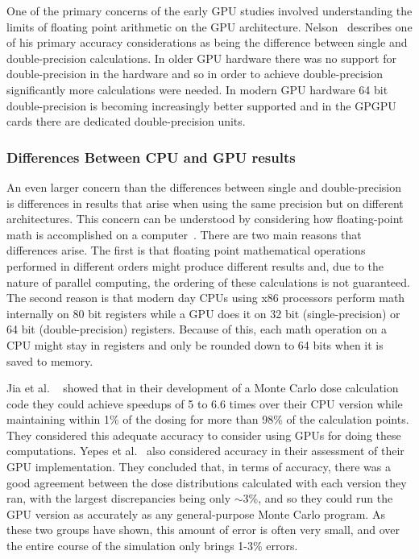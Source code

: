 One of the primary concerns of the early GPU studies involved understanding the limits of floating point arithmetic on the GPU architecture.
%
Nelson~\cite{nelson2009monte} describes one of his primary accuracy considerations as being the difference between single and double-precision calculations.
%
In older GPU hardware there was no support for double-precision in the hardware and so in order to achieve double-precision significantly more calculations were needed.
%
In modern GPU hardware 64 bit double-precision is becoming increasingly better supported and in the GPGPU cards there are dedicated double-precision units.
%

\subsubsection*{\textbf{Differences Between CPU and GPU results}}

An even larger concern than the differences between single and double-precision is differences in results that arise when using the same precision but on different architectures.
%
This concern can be understood by considering how floating-point math is accomplished on a computer~\cite{goldberg1991every}.
%
There are two main reasons that differences arise.
%
The first is that floating point mathematical operations performed in different orders might produce different results and, due to the nature of parallel computing, the ordering of these calculations is not guaranteed.
%
The second reason is that modern day CPUs using x86 processors perform math internally on 80 bit registers while a GPU does it on 32 bit (single-precision) or 64 bit (double-precision) registers.
%
Because of this, each math operation on a CPU might stay in registers and only be rounded down to 64 bits when it is saved to memory.
%

%
Jia et al. ~\cite{jia2010development} showed that in their development of a Monte Carlo dose calculation code they could achieve speedups of 5 to 6.6 times over their CPU version while maintaining within 1\% of the dosing for more than 98\% of the calculation points.
%
They considered this adequate accuracy to consider using GPUs for doing these computations.
%
Yepes et al.~\cite{yepes2010gpu} also considered accuracy in their assessment of their GPU implementation.
%
They concluded that, in terms of accuracy, there was a good agreement between the dose distributions calculated with each version they ran, with the largest discrepancies being only $\sim$3\%, and so they could run the GPU version as accurately as any general-purpose Monte Carlo program.
%
As these two groups have shown, this amount of error is often very small, and over the entire course of the simulation only brings 1-3\% errors.

